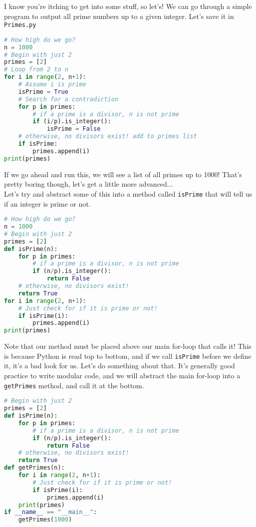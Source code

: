 \documentclass[12pt]{article}
\begin{document}
I know you're itching to get into some stuff, so let's! We can go through a simple program to output all prime numbers up to a given integer. Let's save it in \texttt{Primes.py}\\
\begin{lstlisting}[language=Python]
# How high do we go?
n = 1000
# Begin with just 2
primes = [2]
# Loop from 2 to n
for i in range(2, n+1):
    # Assume i is prime
    isPrime = True
    # Search for a contradiction
    for p in primes:
        # if a prime is a divisor, n is not prime
        if (i/p).is_integer():
            isPrime = False
    # otherwise, no divisors exist! add to primes list
    if isPrime:
        primes.append(i)
print(primes)
\end{lstlisting}
If we go ahead and run this, we will see a list of all primes up to 1000! That's pretty boring though, let's get a little more advanced...\\
Let's try and abstract some of this into a method called \texttt{isPrime} that will tell us if an integer is prime or not.\\
\begin{lstlisting}[language=Python]
# How high do we go?
n = 1000
# Begin with just 2
primes = [2]
def isPrime(n):
    for p in primes:
        # if a prime is a divisor, n is not prime
        if (n/p).is_integer():
            return False
    # otherwise, no divisors exist!
    return True
for i in range(2, n+1):
    # Just check for if it is prime or not!
    if isPrime(i):
        primes.append(i)
print(primes)
\end{lstlisting}
Note that our method must be placed above our main for-loop that calls it! This is because Python is read top to bottom, and if we call \texttt{isPrime} before we define it, it's a bad look for us. Let's do something about that. It's generally good practice to write modular code, and we will abstract the main for-loop into a \texttt{getPrimes} method, and call it at the bottom.\\
\begin{lstlisting}[language=Python]
# Begin with just 2
primes = [2]
def isPrime(n):
    for p in primes:
        # if a prime is a divisor, n is not prime
        if (n/p).is_integer():
            return False
    # otherwise, no divisors exist!
    return True
def getPrimes(n):
    for i in range(2, n+1):
        # Just check for if it is prime or not!
        if isPrime(i):
            primes.append(i)
    print(primes)
if __name__ == "__main__":
    getPrimes(1000)
\end{lstlisting}
\end{document}
